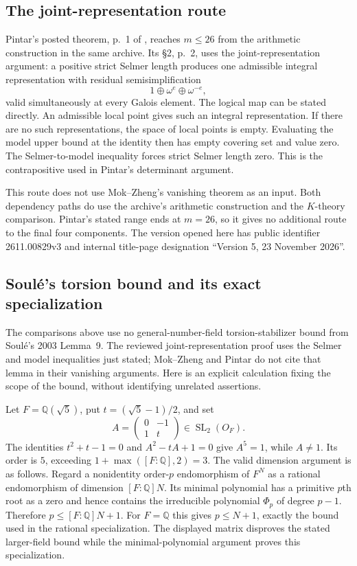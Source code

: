 \documentclass[11pt]{article}
\theoremstyle{definition}\newtheorem{definition}[theorem]{Definition}
\begin{document}
\subsection{The joint-representation route}

Pintar's posted theorem, p.~1 of \cite{Pintar}, reaches
$m\leq26$ from the arithmetic construction in the same
archive. Its \S2, p.~2, uses the joint-representation
argument: a positive strict Selmer length produces one
admissible integral representation with residual
semisimplification
\[
                 1\oplus\omega^e\oplus\omega^{-e},
\]
valid simultaneously at every Galois element. The logical
map can be stated directly. An admissible local point gives
such an integral representation. If there are no such
representations, the space of local points is empty.
Evaluating the model upper bound at the identity then has
empty covering set and value zero. The Selmer-to-model
inequality forces strict Selmer length zero. This is the
contrapositive used in Pintar's determinant argument.

This route does not use Mok--Zheng's vanishing theorem as
an input. Both dependency paths do use the archive's
arithmetic construction and the $K$-theory comparison.
Pintar's stated range ends at $m=26$, so it gives no
additional route to the final four components. The version
opened here has public identifier 2611.00829v3 and internal
title-page designation ``Version 5, 23 November 2026''.

\subsection{Soul\'e's torsion bound and its exact specialization}

The comparisons above use no general-number-field
torsion-stabilizer bound from Soul\'e's 2003 Lemma~9.
The reviewed joint-representation proof uses the Selmer
and model inequalities just stated; Mok--Zheng and Pintar
do not cite that lemma in their vanishing arguments.
Here is an explicit calculation fixing the scope of the
bound, without identifying unrelated assertions.

Let $F=\mathbb Q(\sqrt5)$, put $t=(\sqrt5-1)/2$, and set
\[
                 A=\begin{pmatrix}0&-1\\1&t\end{pmatrix}
                    \in\operatorname{SL}_2(O_F).
\]
The identities $t^2+t-1=0$ and $A^2-tA+1=0$ give
$A^5=1$, while $A\ne1$. Its order is $5$, exceeding
$1+\max([F:\mathbb Q],2)=3$.
The valid dimension argument is as follows. Regard a
nonidentity order-$p$ endomorphism of $F^N$ as a rational
endomorphism of dimension $[F:\mathbb Q]N$. Its minimal
polynomial has a primitive $p$th root as a zero and hence
contains the irreducible polynomial $\Phi_p$ of degree
$p-1$. Therefore $p\leq[F:\mathbb Q]N+1$. For
$F=\mathbb Q$ this gives $p\leq N+1$, exactly the bound
used in the rational specialization. The displayed
matrix disproves the stated larger-field bound while
the minimal-polynomial argument proves this specialization.
\end{document}
